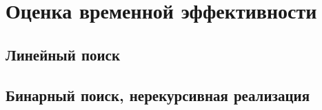 \documentclass{bmstu}
\begin{document}
\section{Оценка временной эффективности}
%

\subsection{Линейный поиск}

\subsection{Бинарный поиск, нерекурсивная реализация}


\end{document}
